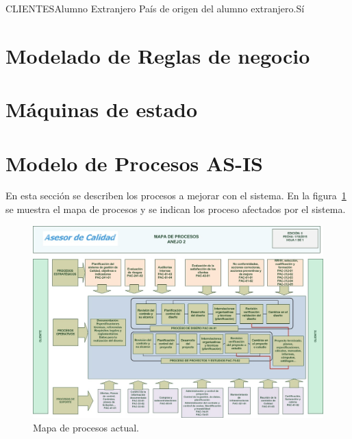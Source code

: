 \begin{cdtEntidad}{CLIENTES}{Alumno Extranjero}%
		{País de origen del alumno extranjero.}{Sí}
	\cdtEntityRelSection
\end{cdtEntidad}

\section{Modelado de Reglas de negocio}





\section{Máquinas de estado}



\section{Modelo de Procesos AS-IS}


En esta sección se describen los procesos a mejorar con el sistema. En la figura~\ref{fig:mapaProc} se muestra el mapa de procesos y se indican los proceso afectados por el sistema.

\begin{figure}[htbp]
	\begin{center}
		\includegraphics[width=.8\textwidth]{images/mapaProc}
		\caption{Mapa de procesos actual.}
		\label{fig:mapaProc}
	\end{center}
\end{figure}

